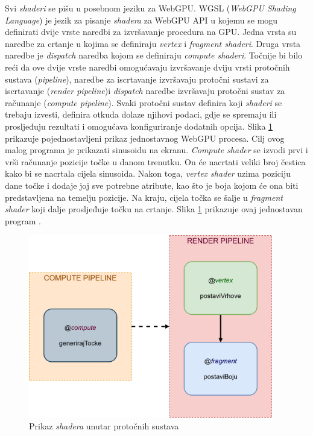 \documentclass{foi}
\begin{document}
  
Svi \textit{shaderi} se pišu u posebnom jeziku za WebGPU. WGSL (\textit{WebGPU Shading Language}) je jezik za pisanje \textit{shadera} za WebGPU API u kojemu se mogu definirati dvije vrste naredbi za izvršavanje procedura na GPU. Jedna vrsta su naredbe za crtanje u kojima se definiraju \textit{vertex} i \textit{fragment shaderi}. Druga vrsta naredbe je \textit{dispatch} naredba kojom se definiraju \textit{compute shaderi}. Točnije bi bilo reći da ove dvije vrste naredbi omogućavaju izvršavanje dviju vrsti protočnih sustava (\textit{pipeline}), naredbe za iscrtavanje izvršavaju protočni sustavi za iscrtavanje (\textit{render pipeline})i \textit{dispatch} naredbe izvršavaju protočni sustav za računanje (\textit{compute pipeline}). Svaki protočni sustav definira koji \textit{shaderi} se trebaju izvesti, definira otkuda dolaze njihovi podaci, gdje se spremaju ili prosljeđuju rezultati i omogućava konfiguriranje dodatnih opcija. Slika \ref{fig:Pipelines} prikazuje pojednostavljeni prikaz jednostavnog WebGPU procesa. Cilj ovog malog programa je prikazati sinusoidu na ekranu. \textit{Compute shader} se izvodi prvi i vrši računanje pozicije točke u danom trenutku. On će nacrtati veliki broj čestica kako bi se nacrtala cijela sinusoida. Nakon toga, \textit{vertex shader} uzima poziciju dane točke i dodaje joj sve potrebne atribute, kao što je boja kojom će ona biti predstavljena na temelju pozicije. Na kraju, cijela točka se šalje u \textit{fragment shader} koji dalje prosljeđuje točku na crtanje. Slika \ref{fig:Pipelines} prikazuje ovaj jednostavan program \parencite{TourOfWGSL}. 

\begin{figure}[H]
	\centering
	\includegraphics[width=0.95\textwidth]{slike/38_Pipelines.png}
	\captionsetup{justification=centering}
	\caption{Prikaz \textit{shadera} unutar protočnih sustava}
	\label{fig:Pipelines}
\end{figure}
\end{document}
